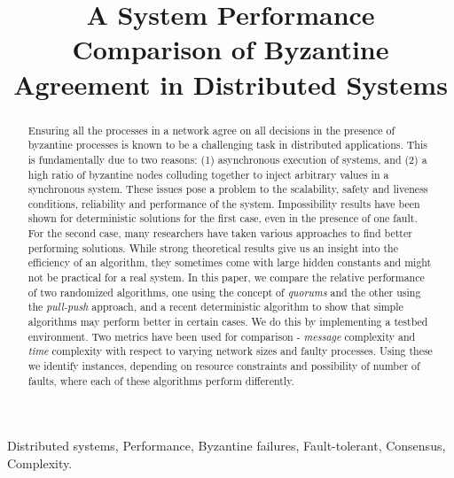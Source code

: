 \title{A System Performance Comparison of Byzantine Agreement in Distributed Systems}



\maketitle

\begin{abstract}

Ensuring all the processes in a network agree on all decisions in the presence of byzantine processes is known to be a challenging task in distributed applications. This is fundamentally due to two reasons: (1) asynchronous execution of systems, and (2) a high ratio of byzantine nodes colluding together to inject arbitrary values in a synchronous system. These issues pose a problem to the scalability, safety and liveness conditions, reliability and performance of the system. Impossibility results have been shown for deterministic solutions for the first case, even in the presence of one fault. For the second case, many researchers have taken various approaches to find better performing solutions. While strong theoretical results give us an insight into the efficiency of an algorithm, they sometimes come with large hidden constants and might not be practical for a real system. In this paper, we compare the relative performance of two randomized algorithms, one using the concept of {\em quorums} and the other using the {\em pull-push} approach, and a recent deterministic algorithm to show that simple algorithms may perform better in certain cases. We do this by implementing a testbed environment. Two metrics have been used for comparison - {\em message} complexity and {\em time} complexity with respect to varying network sizes and faulty processes. Using these we identify instances, depending on resource constraints and possibility of number of faults, where each of these algorithms perform differently.

\end{abstract}

 Distributed systems, Performance, Byzantine failures, Fault-tolerant, Consensus, Complexity.
